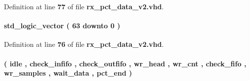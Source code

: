 Definition at line {\bf 77} of file {\bf rx\+\_\+pct\+\_\+data\+\_\+v2.\+vhd}.

\paragraph[{lpmcnt\+\_\+q}]{ {\bfseries \textcolor{comment}{std\+\_\+logic\+\_\+vector}\textcolor{vhdlchar}{ }\textcolor{vhdlchar}{(}\textcolor{vhdlchar}{ }\textcolor{vhdlchar}{ } \textcolor{vhdldigit}{63} \textcolor{vhdlchar}{ }\textcolor{keywordflow}{downto}\textcolor{vhdlchar}{ }\textcolor{vhdlchar}{ } \textcolor{vhdldigit}{0} \textcolor{vhdlchar}{ }\textcolor{vhdlchar}{)}\textcolor{vhdlchar}{ }} \hspace{0.3cm}{\ttfamily [Signal]}}\label{classrx__pct__data__v2_1_1arch_a6118645b7238c237e579cd65ba167f7c}


Definition at line {\bf 76} of file {\bf rx\+\_\+pct\+\_\+data\+\_\+v2.\+vhd}.

\paragraph[{main\+\_\+states}]{ {\bfseries \textcolor{vhdlchar}{(}\textcolor{vhdlchar}{ }\textcolor{vhdlchar}{idle}\textcolor{vhdlchar}{ }\textcolor{vhdlchar}{,}\textcolor{vhdlchar}{ }\textcolor{vhdlchar}{check\+\_\+infifo}\textcolor{vhdlchar}{ }\textcolor{vhdlchar}{,}\textcolor{vhdlchar}{ }\textcolor{vhdlchar}{check\+\_\+outfifo}\textcolor{vhdlchar}{ }\textcolor{vhdlchar}{,}\textcolor{vhdlchar}{ }\textcolor{vhdlchar}{wr\+\_\+head}\textcolor{vhdlchar}{ }\textcolor{vhdlchar}{,}\textcolor{vhdlchar}{ }\textcolor{vhdlchar}{wr\+\_\+cnt}\textcolor{vhdlchar}{ }\textcolor{vhdlchar}{,}\textcolor{vhdlchar}{ }\textcolor{vhdlchar}{check\+\_\+fifo}\textcolor{vhdlchar}{ }\textcolor{vhdlchar}{,}\textcolor{vhdlchar}{ }\textcolor{vhdlchar}{wr\+\_\+samples}\textcolor{vhdlchar}{ }\textcolor{vhdlchar}{,}\textcolor{vhdlchar}{ }\textcolor{vhdlchar}{wait\+\_\+data}\textcolor{vhdlchar}{ }\textcolor{vhdlchar}{,}\textcolor{vhdlchar}{ }\textcolor{vhdlchar}{pct\+\_\+end}\textcolor{vhdlchar}{ }\textcolor{vhdlchar}{)}\textcolor{vhdlchar}{ }} \hspace{0.3cm}{\ttfamily [Type]}}\label{classrx__pct__data__v2_1_1arch_a43a7dc6cc35343c859f3ba29c60c08ab}


